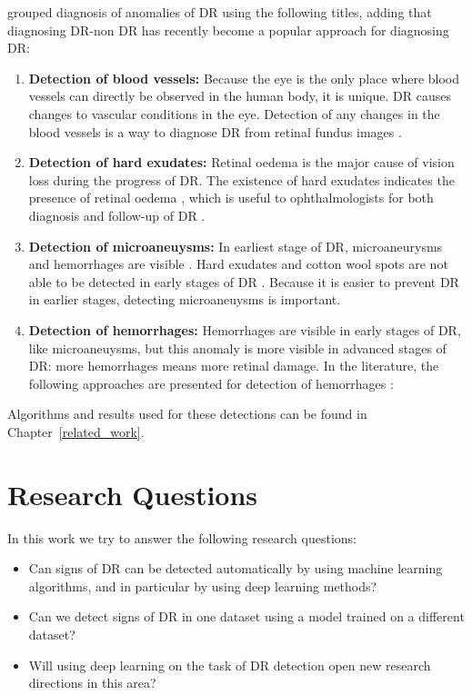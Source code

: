 \citet{rocha2011points} grouped diagnosis of anomalies of DR using the following titles, adding that diagnosing DR-non DR has recently become a popular approach for diagnosing DR:  
\begin{enumerate}
    \item \textbf{Detection of blood vessels:}  Because the eye is the only place where blood vessels can directly be observed in the human body, it is unique. DR causes changes to vascular conditions in the eye. Detection of any changes in the blood vessels is a way to diagnose DR from retinal fundus images \citet{mendonca2006segmentation}.
    \item \textbf{Detection of hard exudates:} Retinal oedema is the major cause of vision loss during the progress of DR. The existence of hard exudates indicates the presence of retinal oedema \citep{singer1992screening}, which is useful to ophthalmologists for both diagnosis and follow-up of DR \citep{garcia2009neural}.
    \item \textbf{Detection of microaneuysms:} In earliest stage of DR, microaneurysms and hemorrhages are visible \citep{doi:10.1056/NEJMra021678}. Hard exudates and cotton wool spots are not able to be detected in early stages of DR \citep{navarro2016automatic}. Because it is easier to prevent DR in earlier stages, detecting microaneuysms is important.
    \item \textbf{Detection of hemorrhages:} Hemorrhages are visible in early stages of DR, like microaneuysms, but this anomaly is more visible in advanced stages of DR: more hemorrhages means more retinal damage. In the literature, the following approaches are presented for detection of hemorrhages \citep{rocha2011points}:
\end{enumerate}

Algorithms and results used for these detections can be found in Chapter~\ref{related_work}.

\section{Research Questions}
In this work we try to answer the following research questions:

\begin{itemize}
    \item Can signs of DR can be detected automatically by using machine learning algorithms, and in particular by using deep learning methods?
    \item Can we detect signs of DR in one dataset using a model trained on a different dataset?
    \item Will using deep learning on the task of DR detection open new research directions in this area? 
\end{itemize}

